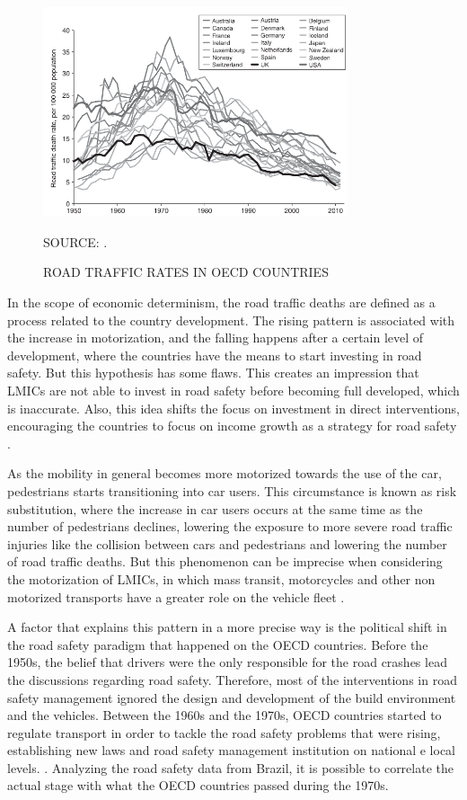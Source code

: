 \begin{figure}[!htbp]
    \centering\footnotesize
    \captionsetup{font=footnotesize}
    \caption{ROAD TRAFFIC RATES IN OECD COUNTRIES}
    \includegraphics[width=0.8\textwidth]{fig/oecd.png}
    \label{fig:oecd}
    \par SOURCE: \textcite{Bhalla2016}.
\end{figure}

In the scope of economic determinism, the road traffic deaths are defined as a process related to the country development. The rising pattern is associated with the increase in motorization, and the falling happens after a certain level of development, where the countries have the means to start investing in road safety. But this hypothesis has some flaws. This creates an impression that LMICs are not able to invest in road safety before becoming full developed, which is inaccurate. Also, this idea shifts the focus on investment in direct interventions, encouraging the countries to focus on income growth as a strategy for road safety \cite{Bhalla2016}.

As the mobility in general becomes more motorized towards the use of the car, pedestrians starts transitioning into car users. This circumstance is known as risk substitution, where the increase in car users occurs at the same time as the number of pedestrians declines, lowering the exposure to more severe road traffic injuries like the collision between cars and pedestrians and lowering the number of road traffic deaths. But this phenomenon can be imprecise when considering the motorization of LMICs, in which mass transit, motorcycles and other non motorized transports have a greater role on the vehicle fleet \cite{Bhalla2016}.   

A factor that explains this pattern in a more precise way is the political shift in the road safety paradigm that happened on the OECD countries. Before the 1950s, the belief that drivers were the only responsible for the road crashes lead the discussions regarding road safety. Therefore, most of the interventions in road safety management ignored the design and development of the build environment and the vehicles. Between the 1960s and the 1970s, OECD countries started to regulate transport in order to tackle the road safety problems that were rising, establishing new laws and road safety management institution on national e local levels. \cite{Bhalla2016}. Analyzing the road safety data from Brazil, it is possible to correlate the actual stage with what the OECD countries passed during the 1970s.

